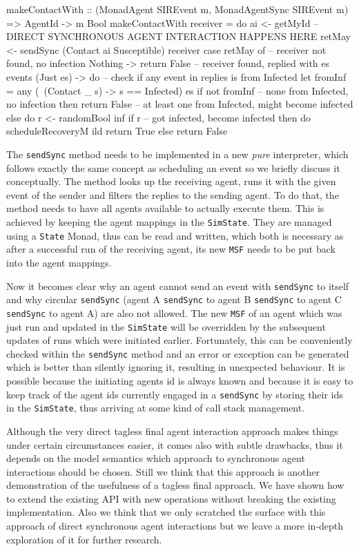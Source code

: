 \begin{HaskellCode}
makeContactWith :: (MonadAgent SIREvent m, MonadAgentSync SIREvent m) 
                => AgentId -> m Bool
makeContactWith receiver = do
  ai     <- getMyId
  -- DIRECT SYNCHRONOUS AGENT INTERACTION HAPPENS HERE
  retMay <- sendSync (Contact ai Susceptible) receiver
  case retMay of 
    -- receiver not found, no infection
    Nothing -> return False
    -- receiver found, replied with es events
    (Just es) -> do
      -- check if any event in replies is from Infected
      let fromInf = any (\ (Contact _ s) -> s == Infected) es
      if not fromInf
        -- none from Infected, no infection
        then return False
        -- at least one from Infected, might become infected
        else do
          r <- randomBool inf
          if r 
            -- got infected, become infected
            then do
              scheduleRecoveryM ild
              return True
            else return False
\end{HaskellCode}

The \texttt{sendSync} method needs to be implemented in a new \textit{pure} interpreter, which follows exactly the same concept as scheduling an event so we briefly discuss it conceptually. The method looks up the receiving agent, runs it with the given event of the sender and filters the replies to the sending agent. To do that, the method needs to have all agents available to actually execute them. This is achieved by keeping the agent mappings in the \texttt{SimState}. They are managed using a \texttt{State} Monad, thus can be read and written, which both is necessary as after a successful run of the receiving agent, its new \texttt{MSF} needs to be put back into the agent mappings.

Now it becomes clear why an agent cannot send an event with \texttt{sendSync} to itself and why circular \texttt{sendSync} (agent A \texttt{sendSync} to agent B \texttt{sendSync} to agent C \texttt{sendSync} to agent A) are also not allowed. The new \texttt{MSF} of an agent which was just run and updated in the \texttt{SimState} will be overridden by the subsequent updates of runs which were initiated earlier. Fortunately, this can be conveniently checked within the \texttt{sendSync} method and an error or exception can be generated which is better than silently ignoring it, resulting in unexpected behaviour. It is possible because the initiating agents id is always known and because it is easy to keep track of the agent ids currently engaged in a \texttt{sendSync} by storing their ids in the \texttt{SimState}, thus arriving at some kind of call stack management.

Although the very direct tagless final agent interaction approach makes things under certain circumstances easier, it comes also with subtle drawbacks, thus it depends on the model semantics which approach to synchronous agent interactions should be chosen. Still we think that this approach is another demonstration of the usefulness of a tagless final approach. We have shown how to extend the existing API with new operations without breaking the existing implementation. Also we think that we only scratched the surface with this approach of direct synchronous agent interactions but we leave a more in-depth exploration of it for further research.